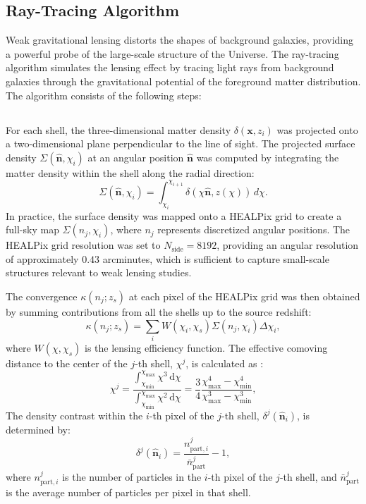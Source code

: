 \subsection{Ray-Tracing Algorithm}
Weak gravitational lensing distorts the shapes of background galaxies, providing a powerful probe of the large-scale structure of the Universe. The ray-tracing algorithm simulates the lensing effect by tracing light rays from background galaxies through the gravitational potential of the foreground matter distribution. The algorithm consists of the following steps:

\subsection{}

For each shell, the three-dimensional matter density $\delta(\mathbf{x}, z_i)$ was projected onto a two-dimensional plane perpendicular to the line of sight. The projected surface density $\Sigma(\hat{\mathbf{n}}, \chi_i)$ at an angular position $\hat{\mathbf{n}}$ was computed by integrating the matter density within the shell along the radial direction:
\begin{equation}
    \Sigma(\hat{\mathbf{n}}, \chi_i) = \int_{\chi_i}^{\chi_{i+1}} \delta(\chi \hat{\mathbf{n}}, z(\chi)) \, d\chi.
\end{equation}
In practice, the surface density was mapped onto a HEALPix grid \citep{Górski_2005} to create a full-sky map $\Sigma(n_j, \chi_i)$, where $n_j$ represents discretized angular positions. The HEALPix grid resolution was set to $N_{\text{side}} = 8192$, providing an angular resolution of approximately $0.43$ arcminutes, which is sufficient to capture small-scale structures relevant to weak lensing studies.

The convergence $\kappa(n_j; z_s)$ at each pixel of the HEALPix grid was then obtained by summing contributions from all the shells up to the source redshift:
\begin{equation}
    \kappa(n_j; z_s) = \sum_{i} W(\chi_i, \chi_s) \Sigma(n_j, \chi_i) \Delta \chi_i,
\end{equation}
where $W(\chi, \chi_s)$ is the lensing efficiency function.
The effective comoving distance to the center of the $j$-th shell, $\chi^j$, is calculated as \citep{2015MNRAS.453.3043S}:
\begin{equation}
    \chi^j = \frac{\int_{\chi_{\min}}^{\chi_{\max}} \chi^3 \, \mathrm{d}\chi}{\int_{\chi_{\min}}^{\chi_{\max}} \chi^2 \, \mathrm{d}\chi} = \frac{3}{4} \frac{\chi_{\max}^4 - \chi_{\min}^4}{\chi_{\max}^3 - \chi_{\min}^3},
\end{equation}
The density contrast within the $i$-th pixel of the $j$-th shell, $\delta^j(\hat{\boldsymbol{n}}_i)$, is determined by:
\begin{equation}
    \delta^j(\hat{\boldsymbol{n}}_i) = \frac{n_{\mathrm{part}, i}^j}{\bar{n}_{\mathrm{part}}^j} - 1,
\end{equation}
where $n_{\mathrm{part}, i}^j$ is the number of particles in the $i$-th pixel of the $j$-th shell, and $\bar{n}_{\mathrm{part}}^j$ is the average number of particles per pixel in that shell.